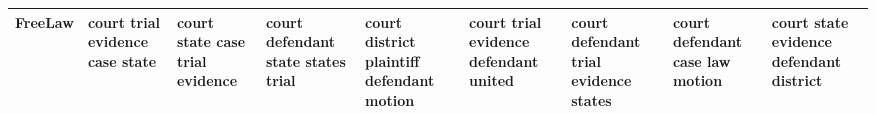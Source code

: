 \documentclass[11pt,a4paper]{article}
\begin{document}
\begin{appendices}
\begin{table*}[htp]
\begin{tiny}
\begin{tabular}{|p{}|p{}|p{}|p{}|p{}|p{}|p{}|p{}|p{}|}
FreeLaw & court \newline trial \newline evidence \newline case \newline state & court \newline state \newline case \newline trial \newline evidence & court \newline defendant \newline state \newline states \newline trial & court \newline district \newline plaintiff \newline defendant \newline motion & court \newline trial \newline evidence \newline defendant \newline united & court \newline defendant \newline trial \newline evidence \newline states & court \newline defendant \newline case \newline law \newline motion & court \newline state \newline evidence \newline defendant \newline district\\\hline

\end{tabular}
\end{tiny}
\end{table*}
\end{appendices}
\end{document}
